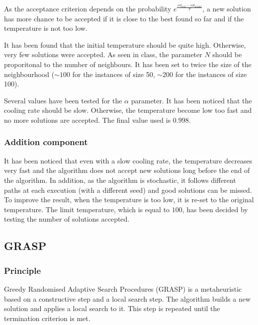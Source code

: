 \documentclass{article}
\begin{document}
As the acceptance criterion depends on the probability $e^{ \frac{sol_{best}-sol_{actual}}{T}}$, a new solution has more chance to be accepted if it is close to the best found so far and if the temperature is not too low. \newline

It has been found that the initial temperature should be quite high.
Otherwise, very few solutions were accepted.
As seen in class, the parameter $N$ should be proporitonal to the number of neighbours.
It has been set to twice the size of the neighbourhood ($\sim100$ for the instances of size 50, $\sim200$ for the instances of size 100).\newline

Several values have been tested for the $\alpha$ parameter.
It has been noticed that the cooling rate should be slow.
Otherwise, the temperature become low too fast and no more solutions are accepted.
The final value used is $0.998$.

\subsubsection{Addition component}

It has been noticed that even with a slow cooling rate, the temperature decreases very fast and the algorithm does not accept new solutions long before the end of the algorithm.
In addition, as the algorithm is stochastic, it follows different paths at each execution (with a different seed) and good solutions can be missed.
To improve the result, when the temperature is too low, it is re-set to the original temperature.
The limit temperature, which is equal to $100$, has been decided by testing the number of solutions accepted.

\subsection{GRASP}

\subsubsection{Principle}

Greedy Randomised Adaptive Search Procedures (GRASP) is a metaheuristic based on a constructive step and a local search step.
The algorithm builds a new solution and applies a local search to it.
This step is repeated until the termination criterion is met.\newline
\end{document}
